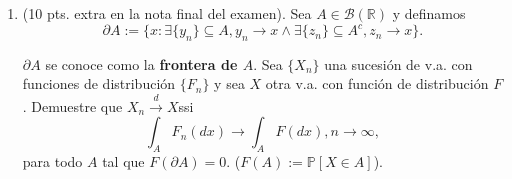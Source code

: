 \documentclass[10pt]{extarticle}
\newcommand{\rr}{\mathbb{R}}
\newcommand{\ci}{\left[}
\newcommand{\cd}{\right]}
\newcommand{\p}{\mathbb{P}}
\begin{document}
\begin{enumerate}
\item (10 pts. extra en la nota final del examen). Sea $A\in\mathcal{B}(\rr)$ y definamos
$$\partial A:=\{x:\exists \{y_n\}\subseteq A, y_n\to x\wedge \exists \{z_n\}\subseteq A^c, z_n\to x\}.$$

$\partial A$ se conoce como la \textbf{frontera de $A$}. Sea $\{X_n\}$ una sucesión de v.a. con funciones de distribución $\{F_n\}$ y sea $X$ otra v.a. con función de distribución $F$. Demuestre que $X_n\overset{d}{\to}X$ssi 
$$\int_A F_n(dx)\to \int_A F(dx), n\to\infty,$$
para todo $A$ tal que $F(\partial A)=0$. ($F(A):=\p\ci X\in A\cd$).
\end{enumerate}
\end{document}
